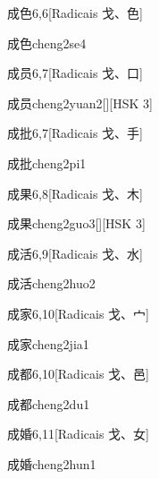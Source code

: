 \begin{entry}{成色}{6,6}[Radicais ⼽、⾊]
  \begin{phonetics}{成色}{cheng2se4}
  \end{phonetics}
\end{entry}

\begin{entry}{成员}{6,7}[Radicais ⼽、⼝]
  \begin{phonetics}{成员}{cheng2yuan2}[][HSK 3]
  \end{phonetics}
\end{entry}

\begin{entry}{成批}{6,7}[Radicais ⼽、⼿]
  \begin{phonetics}{成批}{cheng2pi1}
  \end{phonetics}
\end{entry}

\begin{entry}{成果}{6,8}[Radicais ⼽、⽊]
  \begin{phonetics}{成果}{cheng2guo3}[][HSK 3]
  \end{phonetics}
\end{entry}

\begin{entry}{成活}{6,9}[Radicais ⼽、⽔]
  \begin{phonetics}{成活}{cheng2huo2}
  \end{phonetics}
\end{entry}

\begin{entry}{成家}{6,10}[Radicais ⼽、⼧]
  \begin{phonetics}{成家}{cheng2jia1}
  \end{phonetics}
\end{entry}

\begin{entry}{成都}{6,10}[Radicais ⼽、⾢]
  \begin{phonetics}{成都}{cheng2du1}
  \end{phonetics}
\end{entry}

\begin{entry}{成婚}{6,11}[Radicais ⼽、⼥]
  \begin{phonetics}{成婚}{cheng2hun1}
  \end{phonetics}
\end{entry}

